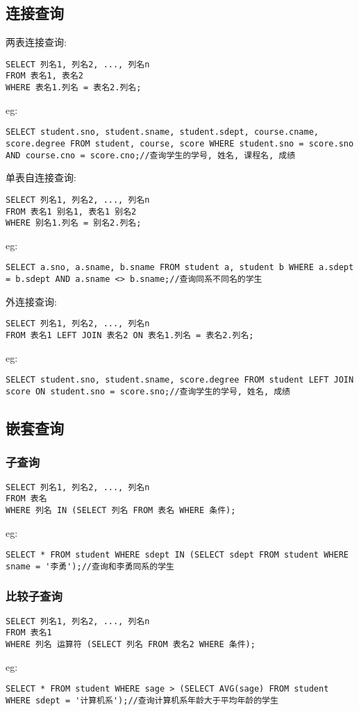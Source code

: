 \subsection{连接查询}
两表连接查询:
\begin{lstlisting}
SELECT 列名1, 列名2, ..., 列名n
FROM 表名1, 表名2
WHERE 表名1.列名 = 表名2.列名;
\end{lstlisting}
eg:
\begin{lstlisting}
SELECT student.sno, student.sname, student.sdept, course.cname, score.degree FROM student, course, score WHERE student.sno = score.sno AND course.cno = score.cno;//查询学生的学号, 姓名, 课程名, 成绩
\end{lstlisting}
单表自连接查询:
\begin{lstlisting}
SELECT 列名1, 列名2, ..., 列名n
FROM 表名1 别名1, 表名1 别名2
WHERE 别名1.列名 = 别名2.列名;
\end{lstlisting}
eg:
\begin{lstlisting}
SELECT a.sno, a.sname, b.sname FROM student a, student b WHERE a.sdept = b.sdept AND a.sname <> b.sname;//查询同系不同名的学生
\end{lstlisting}
外连接查询:
\begin{lstlisting}
SELECT 列名1, 列名2, ..., 列名n
FROM 表名1 LEFT JOIN 表名2 ON 表名1.列名 = 表名2.列名;
\end{lstlisting}
eg:
\begin{lstlisting}
SELECT student.sno, student.sname, score.degree FROM student LEFT JOIN score ON student.sno = score.sno;//查询学生的学号, 姓名, 成绩
\end{lstlisting}
\subsection{嵌套查询}
\subsubsection{子查询}
\begin{lstlisting}
SELECT 列名1, 列名2, ..., 列名n
FROM 表名
WHERE 列名 IN (SELECT 列名 FROM 表名 WHERE 条件);
\end{lstlisting}
eg:
\begin{lstlisting}
SELECT * FROM student WHERE sdept IN (SELECT sdept FROM student WHERE sname = '李勇');//查询和李勇同系的学生
\end{lstlisting}
\subsubsection{比较子查询}
\begin{lstlisting}
SELECT 列名1, 列名2, ..., 列名n
FROM 表名1
WHERE 列名 运算符 (SELECT 列名 FROM 表名2 WHERE 条件);
\end{lstlisting}
eg:
\begin{lstlisting}
SELECT * FROM student WHERE sage > (SELECT AVG(sage) FROM student WHERE sdept = '计算机系');//查询计算机系年龄大于平均年龄的学生
\end{lstlisting}
